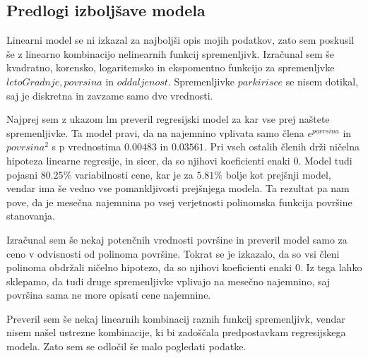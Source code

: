 \documentclass[a4paper, 12pt]{article}
\begin{document}
\subsection{Predlogi izboljšave modela}

Linearni model se ni izkazal za najboljši opis mojih podatkov, zato sem
poskusil še z linearno kombinacijo nelinearnih funkcij spremenljivk.
Izračunal sem še kvadratno, korensko, logaritemsko in ekspomentno funkcijo
za spremenljvke $ letoGradnje, povrsina $ in $ oddaljenost $. Spremenljivke
$ parkirisce $ se nisem dotikal, saj je diskretna in zavzame samo dve
vrednosti.

Najprej sem z ukazom {\sf lm} preveril regresijski model za kar vse prej
naštete spremenljivke. Ta model pravi, da na najemnino vplivata samo člena
$ e^{povrsina} $ in $ povrsina^{2} $ s p vrednostima $ 0.00483 $ in $ 0.03561 $.
Pri vseh ostalih členih drži ničelna hipoteza linearne regresije, in sicer, da
so njihovi koeficienti enaki $ 0 $. Model tudi pojasni $ 80.25\% $ variabilnosti
cene, kar je za $ 5.81\% $ bolje kot prejšnji model, vendar ima še vedno vse
pomankljivosti prejšnjega modela. Ta rezultat pa nam pove, da je mesečna
najemnina po vsej verjetnosti polinomska funkcija površine stanovanja.

Izračunal sem še nekaj potenčnih vrednosti površine in preveril model samo za
ceno v odvisnosti od polinoma površine. Tokrat se je izkazalo, da so vsi členi
polinoma obdržali ničelno hipotezo, da so njihovi koeficienti enaki $ 0 $. Iz
tega lahko sklepamo, da tudi druge spremenljivke vplivajo na mesečno najemnino,
saj površina sama ne more opisati cene najemnine.

Preveril sem še nekaj linearnih kombinacij raznih funkcij spremenljivk, vendar
nisem našel ustrezne kombinacije, ki bi zadoščala predpostavkam regresijskega
modela. Zato sem se odločil še malo pogledati podatke.
\end{document}
